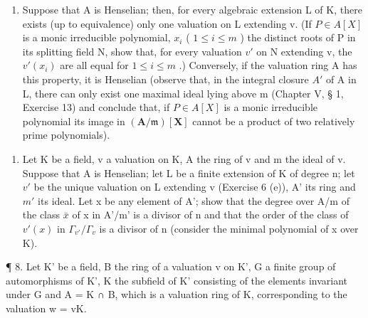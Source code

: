 \begin{enumerate}
\item
  Suppose that A is Henselian; then, for every algebraic extension L of K, there exists (up to equivalence) only one valuation on L extending v. (If \(P \in A[X]\) is a monic irreducible polynomial, \(x_{i}\) ( \(1 \leqslant i \leqslant m\) ) the distinct roots of P in its splitting field N, show that, for every valuation \(v'\) on N extending v, the \(v'(x_{i})\) are all equal for \(1 \leqslant i \leqslant m\) .) Conversely, if the valuation ring A has this property, it is Henselian (observe that, in the integral closure \(A'\) of A in L, there can only exist one maximal ideal lying above m (Chapter V, § 1, Exercise 13) and conclude that, if \(P \in A[X]\) is a monic irreducible polynomial its image in \((\mathbf{A}/\mathfrak{m})[\mathbf{X}]\) cannot be a product of two relatively prime polynomials).
\end{enumerate}

\begin{enumerate}
\def\labelenumi{\arabic{enumi}.}
\setcounter{enumi}{6}
\tightlist
\item
  Let K be a field, v a valuation on K, A the ring of v and m the ideal of v. Suppose that A is Henselian; let L be a finite extension of K of degree n; let \(v'\) be the unique valuation on L extending v (Exercise 6 (e)), A' its ring and \(m'\) its ideal. Let x be any element of A'; show that the degree over A/m of the class \(\bar{x}\) of x in A'/m' is a divisor of n and that the order of the class of \(v'(x)\) in \(\Gamma_{v'}/\Gamma_v\) is a divisor of n (consider the minimal polynomial of x over K).
\end{enumerate}

¶ 8. Let K' be a field, B the ring of a valuation v on K', G a finite group of automorphisms of K', K the subfield of K' consisting of the elements invariant under G and A = K ∩ B, which is a valuation ring of K, corresponding to the valuation w = v\textbar K.

